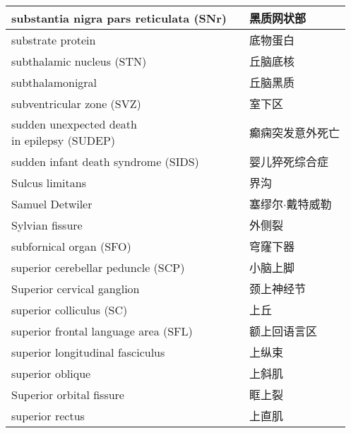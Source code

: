 \begin{longtable}{lll}
	\midrule
	substantia nigra pars reticulata (SNr)  && 黑质网状部 \\
	
	\midrule
	substrate protein  && 底物蛋白 \\
	
	\midrule
	subthalamic nucleus (STN)   && 丘脑底核 \\
	
	\midrule
	subthalamonigral   && 丘脑黑质 \\
	
	\midrule
	subventricular zone (SVZ)   && 室下区 \\
	
	\midrule
	\makecell[l]{sudden unexpected death \\in epilepsy (SUDEP)}  && 癫痫突发意外死亡 \\
	
	\midrule
	sudden infant death syndrome (SIDS)  && 婴儿猝死综合症 \\
	
	\midrule
	Sulcus limitans   && 界沟 \\
	
	\midrule
	Samuel Detwiler   && 塞缪尔$\cdot$戴特威勒 \\
	
	\midrule
	Sylvian fissure   && 外侧裂 \\
	
	\midrule
	subfornical organ (SFO)  && 穹窿下器 \\
	
	\midrule
	superior cerebellar peduncle (SCP)  && 小脑上脚 \\
	
	\midrule
	Superior cervical ganglion   && 颈上神经节 \\
	
	\midrule
	superior colliculus (SC)  && 上丘 \\
	
	\midrule
	superior frontal language area (SFL) && 额上回语言区 \\
	
	\midrule
	superior longitudinal fasciculus   && 上纵束 \\
	
	\midrule
	superior oblique   && 上斜肌 \\
	
	\midrule
	Superior orbital fissure   && 眶上裂 \\
	
	\midrule
	superior rectus   && 上直肌 \\
	

\end{longtable}
